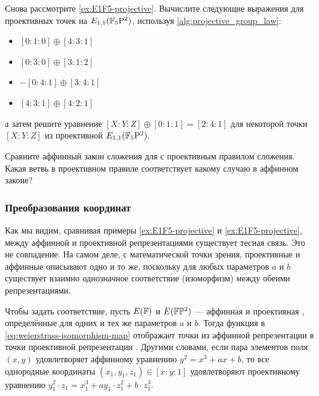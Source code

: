 
\begin{exercise} Снова рассмотрите \examplename{} \ref{ex:E1F5-projective}. Вычислите следующие выражения для проективных точек на $E_{1,1}(\mathbb{F}_5\mathrm{P}^2)$, используя \algname{} \ref{alg:projective_group_law}:
\begin{itemize}
\item $[0:1:0]\oplus [4:3:1]$
\item $[0:3:0]\oplus [3:1:2]$
\item $-[0:4:1]\oplus [3:4:1]$
\item $[4:3:1]\oplus [4:2:1]$
\end{itemize}
а затем решите уравнение $[X:Y:Z] \oplus [0:1:1]= [2:4:1]$ для некоторой точки $[X:Y:Z]$ из проективной  $E_{1,1}(\mathbb{F}_5\mathrm{P}^2)$.
\end{exercise}

\begin{exercise}
Сравните аффинный закон сложения для  с проективным правилом сложения. Какая ветвь в проективном правиле соответствует какому случаю в аффинном законе?
\end{exercise}

\subsubsection{Преобразования координат} Как мы видим, сравнивая примеры 
\ref{ex:E1F5-projective} и \ref{ex:E1F5-projective}, между аффинной и проективной репрезентациями  существует тесная связь. Это не совпадение. На самом деле, с математической точки зрения, проективные и аффинные  описывают одно и то же, поскольку для любых параметров $a$ и $b$ существует взаимно однозначное соответствие (изоморфизм) между обеими репрезентациями. 

Чтобы задать соответствие, пусть $E(\mathbb{F})$ и $E(\mathbb{F}\mathbb{P}^2)$ — аффинная и проективная , определённые для одних и тех же параметров $a$ и $b$. Тогда функция в \eqref{eq:weierstrass-isomorphism-map} отображает точки из аффинной репрезентации в точки проективной репрезентации . Другими словами, если пара элементов поля $(x,y)$ удовлетворяет аффинному уравнению  $y^2= x^3 + ax + b$, то все однородные координаты $(x_1,y_1,z_1)\in [x:y:1]$ удовлетворяют проективному уравнению  $y_1^2\cdot z_1= x_1^3 + ay_1\cdot z_1^2 + b\cdot z_1^3$. 

